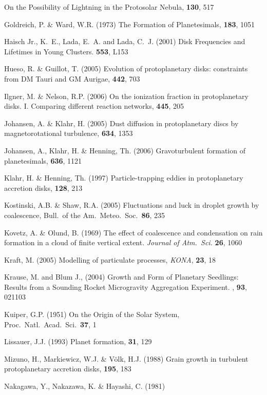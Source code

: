 \begin{literature}
  On the Possibility of Lightning in the Protosolar Nebula,
  \ica \textbf{130}, 517
\item Goldreich, P. \& Ward, W.R. (1973) 
  The Formation of Planetesimals,
  \apj \textbf{183}, 1051 
\item Haisch Jr., K.~E.,  Lada, E.~A. and Lada, C.~J. (2001) 
  Disk Frequencies and Lifetimes in Young Clusters. 
  \apj \textbf{553}, L153
\item Hueso, R. \& Guillot, T. (2005) 
  Evolution of protoplanetary disks: constraints from DM Tauri and GM Aurigae,
  \aap \textbf{442}, 703
\item Ilgner, M. \& Nelson, R.P. (2006) 
  On the ionization fraction in protoplanetary disks. I. Comparing different
  reaction networks,
  \aap \textbf{445}, 205
\item Johansen, A. \& Klahr, H. (2005) 
  Dust diffusion in protoplanetary discs by
  magnetorotational turbulence,
  \apj \textbf{634}, 1353
\item Johansen, A., Klahr, H. \&  Henning, Th. (2006) 
  Gravoturbulent formation of planetesimals,
  \apj \textbf{636}, 1121
\item Klahr, H. \& Henning, Th. (1997) 
  Particle-trapping eddies in protoplanetary accretion disks,
  \ica \textbf{128}, 213
\item Kostinski, A.B. \& Shaw, R.A. (2005) 
  Fluctuations and luck in droplet growth by coalescence,
  Bull.\ of the Am.\ Meteo.\ Soc.\ 
  \textbf{86}, 235
\item Kovetz, A. \& Olund, B. (1969)
  The effect of coalescence and condensation on rain formation in a 
  cloud of finite vertical extent.
  \textit{Journal of Atm.~Sci.} \textbf{26}, 1060
\item Kraft, M. (2005) Modelling of particulate processes,
  \textit{KONA}, \textbf{23}, 18
\item Krause, M. and Blum J., (2004) Growth and Form of Planetary
  Seedlings: Results from a Sounding Rocket Microgravity Aggregation
  Experiment. \prl, \textbf{93}, 021103
\item Kuiper, G.P. (1951) 
  On the Origin of the Solar System,
  Proc.~Natl.~Acad.~Sci.\ \textbf{37}, 1
\item Lissauer, J.J. (1993) 
  Planet formation,
  \araa \textbf{31}, 129
\item Mizuno, H., Markiewicz, W.J. \& V\"olk, H.J. (1988) 
  Grain growth in turbulent protoplanetary accretion disks,
  \aap \textbf{195}, 183
\item Nakagawa, Y., Nakazawa, K. \& Hayashi, C. (1981) 

\end{literature}
